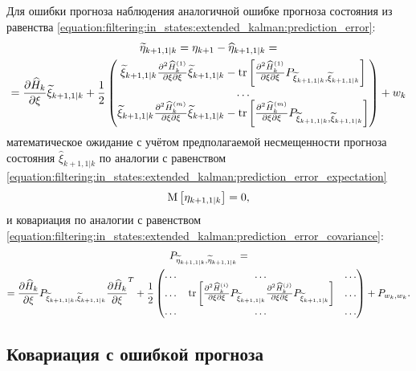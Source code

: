 Для ошибки прогноза наблюдения аналогичной ошибке прогноза состояния из равенства \eqref{equation:filtering:in_states:extended_kalman:prediction_error}:
\begin{multline} \label{equation:filtering:in_states:extended_kalman:observation_prediction_error}
    \widetilde{\eta}_{k+1,1|k}
        = \eta_{k+1} - \widehat{\eta}_{k+1,1|k} = \\
    = \frac{\partial \widehat{H}_k}{\partial \xi} \widetilde{\xi}_{k+1,1|k}
        + \frac{1}{2}
            \begin{pmatrix}
                \widetilde{\xi}_{k+1,1|k} \frac{\partial^2 \widehat{H}_k^{(1)}}{{\partial \xi}{\partial \xi}} \widetilde{\xi}_{k+1,1|k} - \mathrm{tr} \left [ \frac{\partial^2 \widehat{H}_k^{(1)}}{{\partial \xi}{\partial \xi}} P_{\widetilde{\xi}_{k+1,1|k}, \widetilde{\xi}_{k+1,1|k}} \right ] \\
                \dots \\
                \widetilde{\xi}_{k+1,1|k} \frac{\partial^2 \widehat{H}_k^{(m)}}{{\partial \xi}{\partial \xi}} \widetilde{\xi}_{k+1,1|k} - \mathrm{tr} \left [ \frac{\partial^2 \widehat{H}_k^{(m)}}{{\partial \xi}{\partial \xi}} P_{\widetilde{\xi}_{k+1,1|k}, \widetilde{\xi}_{k+1,1|k}} \right ]
            \end{pmatrix}
        + w_k
\end{multline}
математическое ожидание с учётом предполагаемой несмещенности прогноза состояния $\widehat{\xi}_{k+1,1|k}$ по аналогии с равенством
\eqref{equation:filtering:in_states:extended_kalman:prediction_error_expectation}
$$
    \mathrm{M} \left [ \eta_{k+1,1|k} \right ] = 0,
$$
и ковариация по аналогии с равенством \eqref{equation:filtering:in_states:extended_kalman:prediction_error_covariance}:
\begin{multline*}
    P_{\widetilde{\eta}_{k+1,1|k}, \widetilde{\eta}_{k+1,1|k}} = \\
    = \frac{\partial \widehat{H}_k}{\partial \xi} P_{\widetilde{\xi}_{k+1,1|k}, \widetilde{\xi}_{k+1,1|k}} \frac{\partial \widehat{H}_k}{\partial \xi}^T
        + \frac{1}{2}
            \begin{pmatrix}
                \dots & \dots & \dots \\
                \dots & \mathrm{tr} \left [ \frac{\partial^2 \widehat{H}_k^{(i)}}{{\partial \xi}{\partial \xi}} P_{\widetilde{\xi}_{k+1,1|k}} \frac{\partial^2 \widehat{H}_k^{(j)}}{{\partial \xi}{\partial \xi}} P_{\widetilde{\xi}_{k+1,1|k}} \right ] & \dots \\
                \dots & \dots & \dots
            \end{pmatrix}
        + P_{w_k, w_k}
    .
\end{multline*}

\subsection{Ковариация с ошибкой прогноза}

